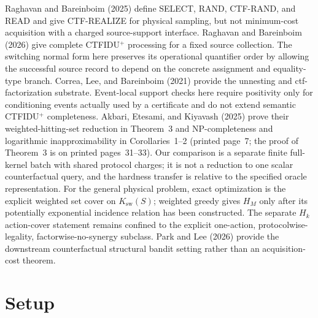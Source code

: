 \documentclass{article}
\begin{document}
Raghavan and Bareinboim (2025) define SELECT, RAND, CTF-RAND, and READ and give CTF-REALIZE for physical sampling, but not minimum-cost acquisition with a charged source-support interface.  Raghavan and Bareinboim (2026) give complete CTFIDU\({}^{+}\) processing for a fixed source collection.  The switching normal form here preserves its operational quantifier order by allowing the successful source record to depend on the concrete assignment and equality-type branch.  Correa, Lee, and Bareinboim (2021) provide the unnesting and ctf-factorization substrate.  Event-local support checks here require positivity only for conditioning events actually used by a certificate and do not extend semantic CTFIDU\({}^{+}\) completeness.  Akbari, Etesami, and Kiyavash (2025) prove their weighted-hitting-set reduction in Theorem~3 and NP-completeness and logarithmic inapproximability in Corollaries~1--2 (printed page~7; the proof of Theorem~3 is on printed pages~31--33).  Our comparison is a separate finite full-kernel batch with shared protocol charges; it is not a reduction to one scalar counterfactual query, and the hardness transfer is relative to the specified oracle representation.  For the general physical problem, exact optimization is the explicit weighted set cover on \(K_{\mathrm{sw}}(S)\); weighted greedy gives \(H_M\) only after its potentially exponential incidence relation has been constructed.  The separate \(H_k\) action-cover statement remains confined to the explicit one-action, protocolwise-legality, factorwise-no-synergy subclass.  Park and Lee (2026) provide the downstream counterfactual structural bandit setting rather than an acquisition-cost theorem.

\section{Setup}
\end{document}
